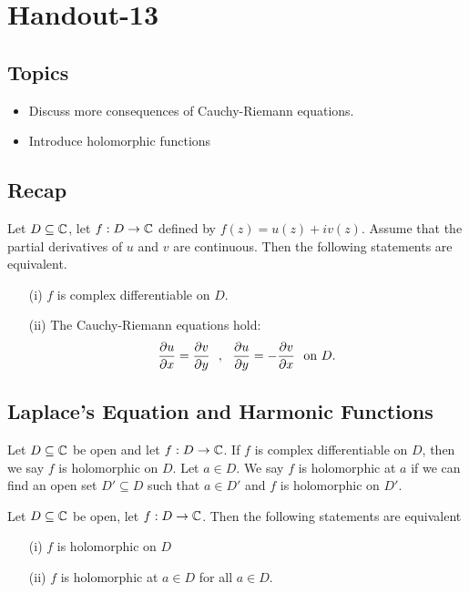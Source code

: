 \documentclass[a4paper]{article}
\begin{document}
\section{Handout-13}

\subsection{Topics}

\begin{itemize}
    \item Discuss more consequences of Cauchy-Riemann equations.
    \item Introduce holomorphic functions
\end{itemize}

\subsection{Recap}

Let \( D \subseteq  \mathbb{C}  \), let \( f: D \to \mathbb{C}  \) defined by \( f(z) = u(z) + i v(z) \). Assume that the partial derivatives of \( u  \) and \( v  \) are continuous. Then the following statements are equivalent.
\begin{enumerate}
    \item[(i)] \( f  \) is complex differentiable on \( D  \).
    \item[(ii)] The Cauchy-Riemann equations hold:
        \[  \frac{\partial u }{\partial x } = \frac{\partial v }{\partial y }  \ \ , \ \ \frac{\partial u }{\partial y }= - \frac{\partial v }{\partial x } \ \ \text{on \( D  \)}. \]
\end{enumerate}

\subsection{Laplace's Equation and Harmonic Functions}

\begin{definition}[ ]
    Let \( D \subseteq  \mathbb{C}   \) be open and let \( f: D \to \mathbb{C}  \). If \( f  \) is complex differentiable on \( D  \), then we say \( f  \) is holomorphic on \( D  \). Let \( a \in D  \). We say \( f  \) is holomorphic at \( a  \) if we can find an open set \( D' \subseteq D  \) such that \( a \in D' \) and \( f  \) is holomorphic on \( D' \).
\end{definition}

\begin{lemma}
    Let \( D \subseteq \mathbb{C}   \) be open, let \( f: D \to \mathbb{C}  \). Then the following statements are equivalent 
    \begin{enumerate}
        \item[(i)] \( f  \) is holomorphic on \( D  \)
        \item[(ii)] \( f  \) is holomorphic at \( a \in D  \) for all \( a \in D  \).
    \end{enumerate}
\end{lemma}
\end{document}
